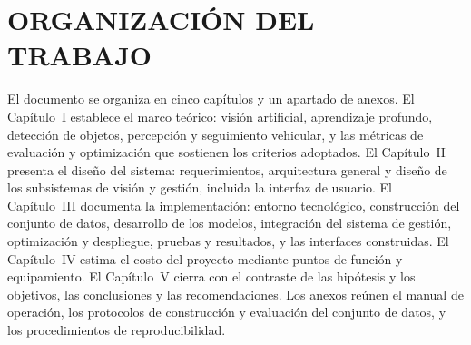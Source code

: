 \section*{ORGANIZACIÓN DEL TRABAJO}

El documento se organiza en cinco capítulos y un apartado de anexos. El
Capítulo~I establece el marco teórico: visión artificial, aprendizaje profundo,
detección de objetos, percepción y seguimiento vehicular, y las métricas de
evaluación y optimización que sostienen los criterios adoptados. El Capítulo~II
presenta el diseño del sistema: requerimientos, arquitectura general y diseño de
los subsistemas de visión y gestión, incluida la interfaz de usuario. El
Capítulo~III documenta la implementación: entorno tecnológico, construcción del
conjunto de datos, desarrollo de los modelos, integración del sistema de gestión,
optimización y despliegue, pruebas y resultados, y las interfaces construidas.
El Capítulo~IV estima el costo del proyecto mediante puntos de función y
equipamiento. El Capítulo~V cierra con el contraste de las hipótesis y los
objetivos, las conclusiones y las recomendaciones. Los anexos reúnen el manual de
operación, los protocolos de construcción y evaluación del conjunto de datos, y
los procedimientos de reproducibilidad.
